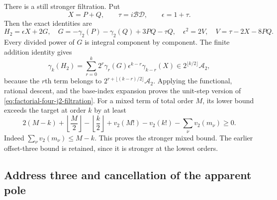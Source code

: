 There is a still stronger filtration. Put
\[
 X=P+Q,\qquad \tau=i\mathcal B\mathcal D,\qquad \epsilon=1+\tau.
\]
Then the exact identities are
\begin{equation}
 H_2=\epsilon X+2G,\quad
 G=-\gamma_2(P)-\gamma_2(Q)+3PQ-\tau Q,\quad
 \epsilon^2=2V,\quad V=\tau-2X-8PQ.
 \label{eq:address-two-filtration-algebra}
\end{equation}
Every divided power of $G$ is integral component by component.
The finite addition identity gives
\begin{equation}
 \gamma_k(H_2)=\sum_{r=0}^k2^r\gamma_r(G)
                  \epsilon^{k-r}\gamma_{k-r}(X)
          \in2^{\lfloor k/2\rfloor}\mathcal A_2,
 \label{eq:address-two-filtration-pd}
\end{equation}
because the $r$th term belongs to
$2^{r+\lfloor(k-r)/2\rfloor}\mathcal A_2$.
Applying the functional, rational descent, and the base-index expansion
proves the unit-step version of
\eqref{eq:factorial-four-j2-filtration}.
For a mixed term of total order $M$, its lower bound exceeds the target
at order $k$ by at least
\[
 2(M-k)+\left\lfloor\frac M2\right\rfloor
          -\left\lfloor\frac k2\right\rfloor
       +v_2(M!)-v_2(k!)-\sum_\nu v_2(m_\nu)\geq0.
\]
Indeed $\sum_\nu v_2(m_\nu)\leq M-k$. This proves the stronger mixed
bound. The earlier offset-three bound is retained, since it is stronger
at the lowest orders.

\subsection{Address three and cancellation of the apparent pole}

